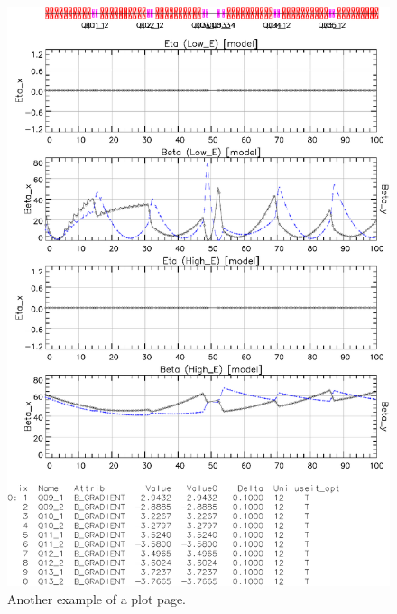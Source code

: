 \begin{figure}
  \centering
  \includegraphics[width=5in]{plot-page2.pdf}
  \caption{Another example of a plot page.}
  \label{f:plot.page2}
\end{figure}

\vfill
\break
